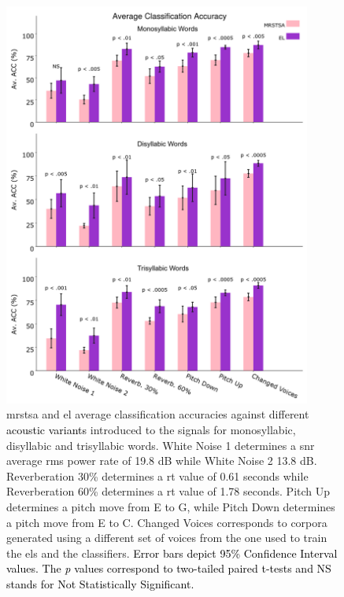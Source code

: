 \documentclass[10pt,letterpaper]{article}
\newcommand{\newreview}[1]{\textcolor{airforceblue}{#1}}
\newcommand{\reviewertwo}[1]{\textcolor{black}{#1}}
\begin{document}
\begin{figure}[h!]
    \centering
    \includegraphics[width=0.9\textwidth]{PLOT.png}
    \caption{\gls{mrstsa} and \gls{el} average classification accuracies against different \reviewertwo{acoustic variants} introduced to the signals
    for monosyllabic, disyllabic and trisyllabic words.
    White Noise 1 determines a \gls{snr} average \gls{rms} power rate of 19.8 dB while White Noise 2 13.8 dB.
    Reverberation 30\% determines a \gls{rt} value of 0.61 seconds while Reverberation 60\% determines a \gls{rt} value of 1.78 seconds.
    Pitch Up determines a pitch move from E to G, while Pitch Down determines a pitch move from E to C. Changed Voices corresponds to corpora generated using a different set of voices from the one used to train the \glspl{el} and the classifiers. \reviewertwo{Error bars depict 95\% Confidence Interval values. The \emph{p} values correspond to \newreview{two-tailed} paired t-tests and NS stands for Not Statistically Significant.}}
    \label{fig:PLOT}
\end{figure}

\end{document}

